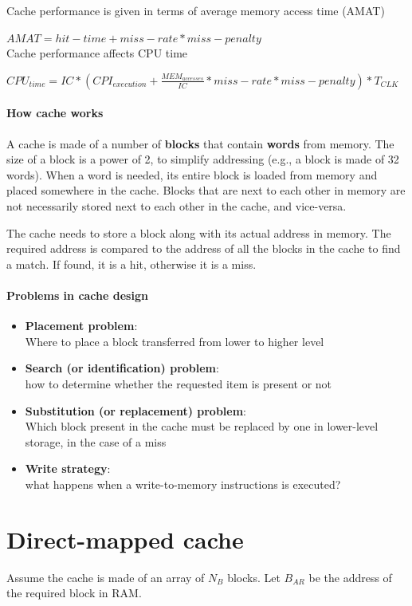 Cache performance is given in terms of average memory access time (AMAT)

$AMAT = hit-time + miss-rate * miss-penalty$\\

Cache performance affects CPU time

$CPU_{time} = IC * (CPI_{execution} + \frac{MEM_{accesses}}{IC} * miss-rate * miss-penalty) * T_{CLK}$

\paragraph{How cache works}
A cache is made of a number of \textbf{blocks} that contain \textbf{words} from memory.
The size of a block is a power of 2, to simplify addressing (e.g., a block is made of 32 words).
When a word is needed, its entire block is loaded from memory and placed somewhere in the cache.
Blocks that are next to each other in memory are not necessarily stored next to each other in the cache, and vice-versa.

The cache needs to store a block along with its actual address in memory.
The required address is compared to the address of all the blocks in the cache to find a match.
If found, it is a hit, otherwise it is a miss.

\paragraph{Problems in cache design}
\begin{itemize}
    \item \textbf{Placement problem}:\\
    Where to place a block transferred from lower to higher level
    \item \textbf{Search (or identification) problem}:\\
    how to determine whether the requested item is present or not
    \item \textbf{Substitution (or replacement) problem}:\\
    Which block present in the cache must be replaced by one in lower-level storage, in the case of a miss
    \item \textbf{Write strategy}:\\
    what happens when a write-to-memory instructions is executed?
\end{itemize}

\section{Direct-mapped cache}
Assume the cache is made of an array of $N_B$ blocks.
Let $B_{AR}$ be the address of the required block in RAM.

